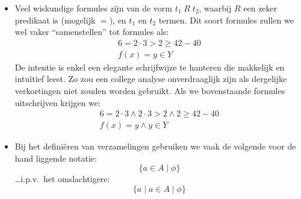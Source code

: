 \begin{itemize}
  \item Veel wiskundige formules zijn van de vorm $t_1\; R\; t_2$, waarbij $R$ een zeker predikaat is (mogelijk $=$), en $t_1$ en $t_2$ termen. Dit soort formules zullen we wel vaker ``samenstellen'' tot formules als:
  \begin{gather*}%
    6 = 2 \cdot 3 > 2 \ge 42 - 40 \\%
    f(x) = y \in Y
  \end{gather*}
  De intentie is enkel een elegante schrijfwijze te hanteren die makkelijk en intuïtief leest. Zo zou een college analyse onverdraaglijk zijn als dergelijke verkortingen niet zouden worden gebruikt.%
  Als we bovenstaande formules uitschrijven krijgen we:
  \begin{gather*}
    6 = 2 \cdot 3 \land 2 \cdot 3 > 2 \land 2 \ge 42 - 40 \\%
    f(x) = y \land y \in Y
  \end{gather*}
  \item Bij het definiëren van verzamelingen gebruiken we vaak de volgende voor de hand liggende notatie: $$ \{a \in A \mid \phi \} $$ \dots i.p.v.~het omslachtigere: $$ \{a \mid a \in A \mid \phi\} $$%
\end{itemize}

